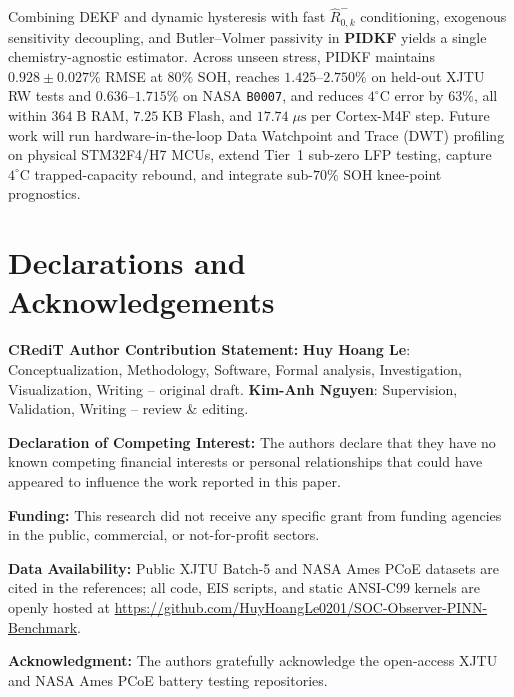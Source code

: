 \documentclass[10pt,a4paper]{article}
\providecommand{\upmu}{\mu}
\begin{document}
Combining DEKF and dynamic hysteresis with fast $\hat{R}_{0,k}^-$ conditioning, exogenous sensitivity decoupling, and Butler--Volmer passivity in \textbf{PIDKF} yields a single chemistry-agnostic estimator. Across unseen stress, PIDKF maintains $0.928\pm0.027\%$ RMSE at $80\%$ SOH, reaches $1.425\text{--}2.750\%$ on held-out XJTU RW tests and $0.636\text{--}1.715\%$ on NASA \texttt{B0007}, and reduces $4^\circ\text{C}$ error by $63\%$, all within $364\;\mathrm{B}$ RAM, $7.25\;\mathrm{KB}$ Flash, and $17.74\;\upmu\mathrm{s}$ per Cortex-M4F step. Future work will run hardware-in-the-loop Data Watchpoint and Trace (DWT) profiling on physical STM32F4/H7 MCUs, extend Tier~1 sub-zero LFP testing, capture $4^\circ\text{C}$ trapped-capacity rebound, and integrate sub-$70\%$ SOH knee-point prognostics.

\section*{Declarations and Acknowledgements}
\noindent\textbf{CRediT Author Contribution Statement:} \textbf{Huy Hoang Le}: Conceptualization, Methodology, Software, Formal analysis, Investigation, Visualization, Writing -- original draft. \textbf{Kim-Anh Nguyen}: Supervision, Validation, Writing -- review \& editing.

\noindent\textbf{Declaration of Competing Interest:} The authors declare that they have no known competing financial interests or personal relationships that could have appeared to influence the work reported in this paper.

\noindent\textbf{Funding:} This research did not receive any specific grant from funding agencies in the public, commercial, or not-for-profit sectors.

\noindent\textbf{Data Availability:} Public XJTU Batch-5 and NASA Ames PCoE datasets are cited in the references; all code, EIS scripts, and static ANSI-C99 kernels are openly hosted at \url{https://github.com/HuyHoangLe0201/SOC-Observer-PINN-Benchmark}.

\noindent\textbf{Acknowledgment:} The authors gratefully acknowledge the open-access XJTU and NASA Ames PCoE battery testing repositories.

\appendix
\end{document}
